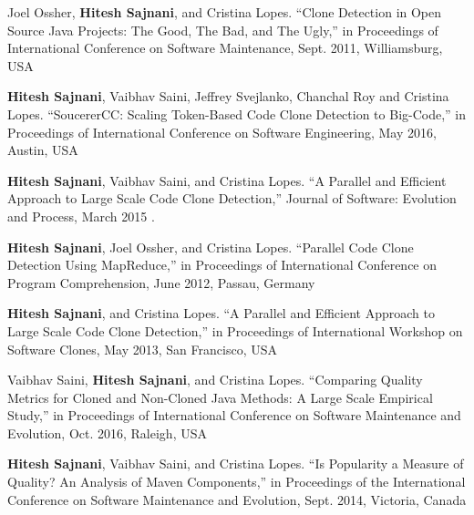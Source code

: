 \documentclass[a4paper]{article}
\begin{document}
\begin{small}

\begin{thebibliography}{}


 Joel Ossher, \textbf{Hitesh Sajnani}, and Cristina Lopes. “Clone Detection in Open Source Java Projects: The Good, The Bad, and The Ugly,” in Proceedings of International Conference on Software Maintenance, Sept. 2011, Williamsburg, USA 

\textbf{Hitesh Sajnani}, Vaibhav Saini, Jeffrey Svejlanko, Chanchal Roy and Cristina Lopes.
“SoucererCC: Scaling Token-Based Code Clone Detection to Big-Code,” in Proceedings
of International Conference on Software Engineering, May 2016, Austin, USA  


\textbf{Hitesh Sajnani}, Vaibhav Saini, and Cristina Lopes. “A Parallel and Efficient Approach to Large Scale Code Clone Detection,” Journal of Software: Evolution and Process, March 2015 .

\textbf{Hitesh Sajnani}, Joel Ossher, and Cristina Lopes. “Parallel Code Clone Detection Using
MapReduce,” in Proceedings of International Conference on Program Comprehension, June
2012, Passau, Germany


\textbf{Hitesh Sajnani}, and Cristina Lopes. “A Parallel and Efficient Approach to Large Scale
Code Clone Detection,” in Proceedings of International Workshop on Software Clones,
May 2013, San Francisco, USA


Vaibhav Saini, \textbf{Hitesh Sajnani}, and Cristina Lopes. “Comparing Quality Metrics for
Cloned and Non-Cloned Java Methods: A Large Scale Empirical Study,” in Proceedings
of International Conference on Software Maintenance and Evolution, Oct. 2016,
Raleigh, USA

\textbf{Hitesh Sajnani}, Vaibhav Saini, and Cristina Lopes. “Is Popularity a Measure of Quality?
An Analysis of Maven Components,” in Proceedings of the International Conference on
Software Maintenance and Evolution, Sept. 2014, Victoria, Canada


\end{thebibliography}
\end{small}
\end{document}

